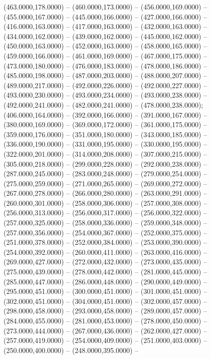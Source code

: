 \begin{scope}[draw=black,fill=c2b83ba,line join=round,line width=0.208pt]
    (463.0000,178.0000) -- (460.0000,173.0000) -- (456.0000,169.0000) --
    (455.0000,167.0000) -- (445.0000,166.0000) -- (427.0000,166.0000) --
    (416.0000,163.0000) -- (417.0000,163.0000) -- (432.0000,163.0000) --
    (434.0000,162.0000) -- (439.0000,162.0000) -- (445.0000,162.0000) --
    (450.0000,163.0000) -- (452.0000,163.0000) -- (458.0000,165.0000) --
    (459.0000,166.0000) -- (461.0000,169.0000) -- (467.0000,175.0000) --
    (473.0000,180.0000) -- (476.0000,183.0000) -- (478.0000,186.0000) --
    (485.0000,198.0000) -- (487.0000,203.0000) -- (488.0000,207.0000) --
    (489.0000,217.0000) -- (492.0000,226.0000) -- (492.0000,227.0000) --
    (493.0000,230.0000) -- (493.0000,234.0000) -- (493.0000,238.0000) --
    (492.0000,241.0000) -- (482.0000,241.0000) -- (478.0000,238.0000);
   (406.0000,164.0000) -- (392.0000,166.0000) --
    (391.0000,167.0000) -- (380.0000,169.0000) -- (369.0000,172.0000) --
    (361.0000,175.0000) -- (359.0000,176.0000) -- (351.0000,180.0000) --
    (343.0000,185.0000) -- (336.0000,190.0000) -- (331.0000,195.0000) --
    (330.0000,195.0000) -- (322.0000,201.0000) -- (314.0000,208.0000) --
    (307.0000,215.0000) -- (305.0000,218.0000) -- (299.0000,228.0000) --
    (292.0000,238.0000) -- (287.0000,245.0000) -- (283.0000,248.0000) --
    (279.0000,254.0000) -- (275.0000,259.0000) -- (271.0000,265.0000) --
    (269.0000,272.0000) -- (267.0000,278.0000) -- (266.0000,280.0000) --
    (263.0000,291.0000) -- (260.0000,301.0000) -- (258.0000,306.0000) --
    (257.0000,308.0000) -- (256.0000,313.0000) -- (256.0000,317.0000) --
    (256.0000,322.0000) -- (257.0000,325.0000) -- (258.0000,336.0000) --
    (259.0000,348.0000) -- (257.0000,356.0000) -- (254.0000,367.0000) --
    (252.0000,375.0000) -- (251.0000,378.0000) -- (252.0000,384.0000) --
    (253.0000,390.0000) -- (254.0000,392.0000) -- (260.0000,411.0000) --
    (263.0000,416.0000) -- (269.0000,427.0000) -- (272.0000,432.0000) --
    (273.0000,435.0000) -- (275.0000,439.0000) -- (278.0000,442.0000) --
    (281.0000,445.0000) -- (285.0000,447.0000) -- (286.0000,448.0000) --
    (290.0000,449.0000) -- (295.0000,451.0000) -- (300.0000,451.0000) --
    (301.0000,451.0000) -- (302.0000,451.0000) -- (304.0000,451.0000) --
    (302.0000,457.0000) -- (298.0000,458.0000) -- (293.0000,458.0000) --
    (289.0000,457.0000) -- (284.0000,455.0000) -- (281.0000,453.0000) --
    (278.0000,450.0000) -- (273.0000,444.0000) -- (267.0000,436.0000) --
    (262.0000,427.0000) -- (257.0000,419.0000) -- (254.0000,409.0000) --
    (251.0000,403.0000) -- (250.0000,400.0000) -- (248.0000,395.0000) --

\end{scope}
